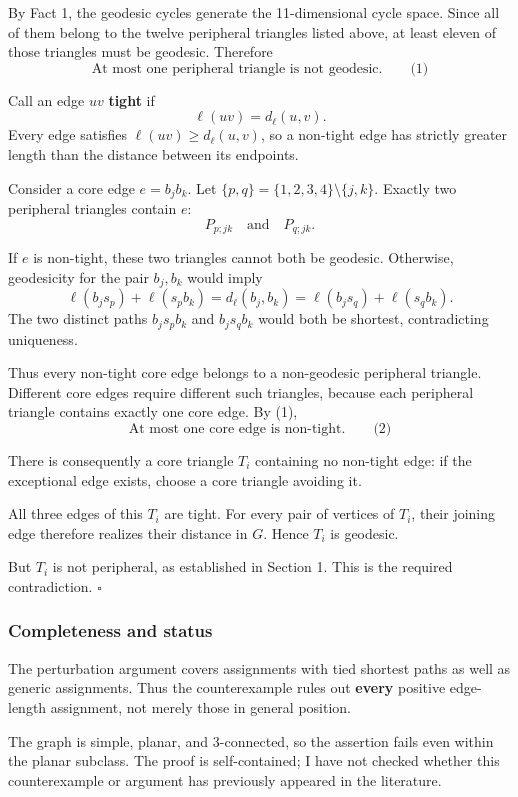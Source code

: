 \documentclass[
  11pt,
  a4paper,
]{article}
\begin{document}
By Fact 1, the geodesic cycles generate the 11-dimensional cycle space.
Since all of them belong to the twelve peripheral triangles listed
above, at least eleven of those triangles must be geodesic. Therefore \[
\boxed{\text{At most one peripheral triangle is not geodesic.}}
\qquad\text{(1)}
\]

Call an edge \(uv\) \textbf{tight} if \[
\ell(uv)=d_\ell(u,v).
\] Every edge satisfies \(\ell(uv)\ge d_\ell(u,v)\), so a non-tight edge
has strictly greater length than the distance between its endpoints.

Consider a core edge \(e=b_jb_k\). Let
\(\{p,q\}=\{1,2,3,4\}\setminus\{j,k\}\). Exactly two peripheral
triangles contain \(e\): \[
P_{p;jk}\quad\text{and}\quad P_{q;jk}.
\]

If \(e\) is non-tight, these two triangles cannot both be geodesic.
Otherwise, geodesicity for the pair \(b_j,b_k\) would imply \[
\ell(b_js_p)+\ell(s_pb_k)
=d_\ell(b_j,b_k)
=\ell(b_js_q)+\ell(s_qb_k).
\] The two distinct paths \(b_js_pb_k\) and \(b_js_qb_k\) would both be
shortest, contradicting uniqueness.

Thus every non-tight core edge belongs to a non-geodesic peripheral
triangle. Different core edges require different such triangles, because
each peripheral triangle contains exactly one core edge. By (1), \[
\boxed{\text{At most one core edge is non-tight.}}
\qquad\text{(2)}
\]

There is consequently a core triangle \(T_i\) containing no non-tight
edge: if the exceptional edge exists, choose a core triangle avoiding
it.

All three edges of this \(T_i\) are tight. For every pair of vertices of
\(T_i\), their joining edge therefore realizes their distance in \(G\).
Hence \(T_i\) is geodesic.

But \(T_i\) is not peripheral, as established in Section 1. This is the
required contradiction. \(\square\)

\subsubsection{Completeness and status}\label{completeness-and-status}

The perturbation argument covers assignments with tied shortest paths as
well as generic assignments. Thus the counterexample rules out
\textbf{every} positive edge-length assignment, not merely those in
general position.

The graph is simple, planar, and 3-connected, so the assertion fails
even within the planar subclass. The proof is self-contained; I have not
checked whether this counterexample or argument has previously appeared
in the literature.
\end{document}
